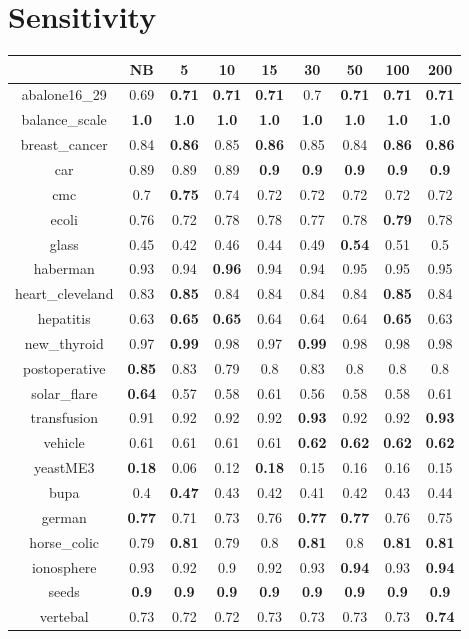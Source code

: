 \documentclass{article}%
\begin{document}
%
\section*{Sensitivity}%
\begin{tabular}{c|cccccccc}%
\hline%
&NB&5&10&15&30&50&100&200\\%
\hline%
abalone16\_29&0.69&\textbf{0.71}&\textbf{0.71}&\textbf{0.71}&0.7&\textbf{0.71}&\textbf{0.71}&\textbf{0.71}\\%
\hline%
balance\_scale&\textbf{1.0}&\textbf{1.0}&\textbf{1.0}&\textbf{1.0}&\textbf{1.0}&\textbf{1.0}&\textbf{1.0}&\textbf{1.0}\\%
\hline%
breast\_cancer&0.84&\textbf{0.86}&0.85&\textbf{0.86}&0.85&0.84&\textbf{0.86}&\textbf{0.86}\\%
\hline%
car&0.89&0.89&0.89&\textbf{0.9}&\textbf{0.9}&\textbf{0.9}&\textbf{0.9}&\textbf{0.9}\\%
\hline%
cmc&0.7&\textbf{0.75}&0.74&0.72&0.72&0.72&0.72&0.72\\%
\hline%
ecoli&0.76&0.72&0.78&0.78&0.77&0.78&\textbf{0.79}&0.78\\%
\hline%
glass&0.45&0.42&0.46&0.44&0.49&\textbf{0.54}&0.51&0.5\\%
\hline%
haberman&0.93&0.94&\textbf{0.96}&0.94&0.94&0.95&0.95&0.95\\%
\hline%
heart\_cleveland&0.83&\textbf{0.85}&0.84&0.84&0.84&0.84&\textbf{0.85}&0.84\\%
\hline%
hepatitis&0.63&\textbf{0.65}&\textbf{0.65}&0.64&0.64&0.64&\textbf{0.65}&0.63\\%
\hline%
new\_thyroid&0.97&\textbf{0.99}&0.98&0.97&\textbf{0.99}&0.98&0.98&0.98\\%
\hline%
postoperative&\textbf{0.85}&0.83&0.79&0.8&0.83&0.8&0.8&0.8\\%
\hline%
solar\_flare&\textbf{0.64}&0.57&0.58&0.61&0.56&0.58&0.58&0.61\\%
\hline%
transfusion&0.91&0.92&0.92&0.92&\textbf{0.93}&0.92&0.92&\textbf{0.93}\\%
\hline%
vehicle&0.61&0.61&0.61&0.61&\textbf{0.62}&\textbf{0.62}&\textbf{0.62}&\textbf{0.62}\\%
\hline%
yeastME3&\textbf{0.18}&0.06&0.12&\textbf{0.18}&0.15&0.16&0.16&0.15\\%
\hline%
bupa&0.4&\textbf{0.47}&0.43&0.42&0.41&0.42&0.43&0.44\\%
\hline%
german&\textbf{0.77}&0.71&0.73&0.76&\textbf{0.77}&\textbf{0.77}&0.76&0.75\\%
\hline%
horse\_colic&0.79&\textbf{0.81}&0.79&0.8&\textbf{0.81}&0.8&\textbf{0.81}&\textbf{0.81}\\%
\hline%
ionosphere&0.93&0.92&0.9&0.92&0.93&\textbf{0.94}&0.93&\textbf{0.94}\\%
\hline%
seeds&\textbf{0.9}&\textbf{0.9}&\textbf{0.9}&\textbf{0.9}&\textbf{0.9}&\textbf{0.9}&\textbf{0.9}&\textbf{0.9}\\%
\hline%
vertebal&0.73&0.72&0.72&0.73&0.73&0.73&0.73&\textbf{0.74}\\%
\hline%
\end{tabular}
\end{document}
